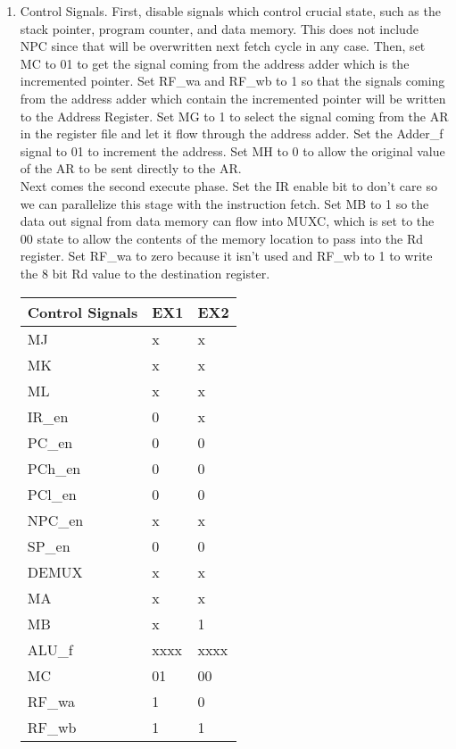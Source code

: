 \documentclass[12pt,letterpaper]{article}
\begin{document}
\begin{enumerate}
\begin{enumerate}
        \item Control Signals. First, disable signals which control crucial state, such as the stack pointer, program counter, and data memory. This does not include NPC since that will be overwritten next fetch cycle in any case. Then, set MC to 01 to get the signal coming from the address adder which is the incremented pointer. Set RF\_wa and RF\_wb to 1 so that the signals coming from the address adder which contain the incremented pointer will be written to the Address Register. Set MG to 1 to select the signal coming from the AR in the register file and let it flow through the address adder. Set the Adder\_f signal to 01 to increment the address. Set MH to 0 to allow the original value of the AR to be sent directly to the AR.\\
        Next comes the second execute phase. Set the IR enable bit to don't care so we can parallelize this stage with the instruction fetch. Set MB to 1 so the data out signal from data memory can flow into MUXC, which is set to the 00 state to allow the contents of the memory location to pass into the Rd register. Set RF\_wa to zero because it isn't used and RF\_wb to 1 to write the 8 bit Rd value to the destination register.\\
            \begin{tabular}{l l l}
                 Control Signals & EX1 & EX2 \\
                 \hline
                 MJ & x & x \\
                 MK & x & x \\
                 ML & x & x \\
                 IR\_en & 0 & x \\
                 PC\_en & 0 & 0 \\
                 PCh\_en & 0 & 0 \\
                 PCl\_en & 0 & 0 \\
                 NPC\_en & x & x \\
                 SP\_en & 0 & 0 \\
                 DEMUX & x & x \\
                 MA & x & x \\
                 MB & x & 1 \\
                 ALU\_f & xxxx & xxxx \\
                 MC & 01 & 00 \\
                 RF\_wa & 1 & 0 \\
                 RF\_wb & 1 & 1 \\

\end{tabular}
\end{enumerate}
\end{enumerate}
\end{document}
